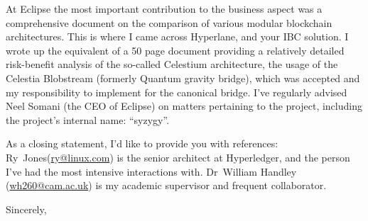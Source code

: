 \documentclass[11pt]{scrlttr2}
\begin{document}
\begin{letter}{
}
At Eclipse the most important contribution to the business aspect was
a comprehensive document on the comparison of various modular
blockchain architectures.  This is where I came across Hyperlane, and
your IBC solution.  I wrote up the equivalent of a 50 page document
providing a relatively detailed risk-benefit analysis of the so-called
Celestium architecture, the usage of the Celestia Blobstream (formerly
Quantum gravity bridge), which was accepted and my responsibility to
implement for the canonical bridge.  I've regularly advised Neel
Somani (the CEO of Eclipse) on matters pertaining to the project,
including the project's internal name: ``syzygy''.

As a closing statement, I'd like to provide you with references:
Ry~Jones(\href{mailto:ry@linux.com}{ry@linux.com}) is the senior
architect at Hyperledger, and the person I've had the most intensive
interactions with. Dr~William Handley
(\href{mailto:wh260@cam.ac.uk}{wh260@cam.ac.uk}) is my academic
supervisor and frequent collaborator.

Sincerely, \\
\end{letter}
\end{document}
